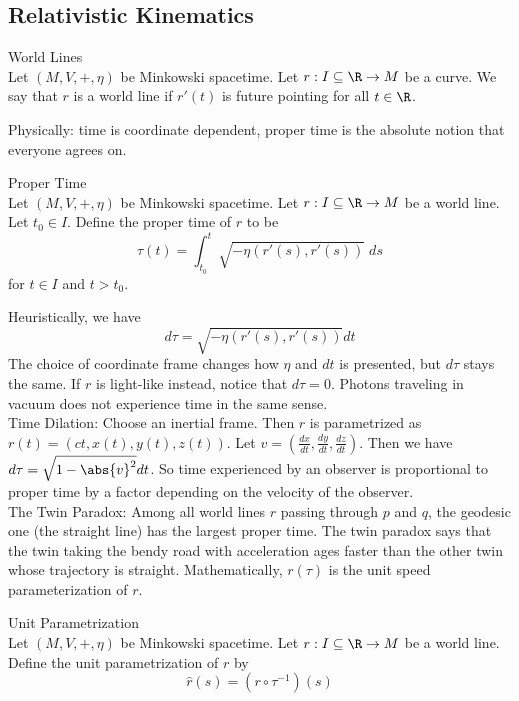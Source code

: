 \documentclass[a4paper]{article}
\begin{document}
\subsection{Relativistic Kinematics}
\begin{defn}{World Lines}{}\\
Let $(M,V,+,\eta)$ be Minkowski spacetime. Let $r:I\subseteq\R\to M$ be a curve. We say that $r$ is a world line if $r'(t)$ is future pointing for all $t\in\R$. 
\end{defn}

Physically: time is coordinate dependent, proper time is the absolute notion that everyone agrees on. 

\begin{defn}{Proper Time}{}\\
Let $(M,V,+,\eta)$ be Minkowski spacetime. Let $r:I\subseteq\R\to M$ be a world line. Let $t_0\in I$. Define the proper time of $r$ to be $$\tau(t)=\int_{t_0}^t\sqrt{-\eta(r'(s),r'(s))}\;ds$$ for $t\in I$ and $t>t_0$. 
\end{defn}

Heuristically, we have $$d\tau=\sqrt{-\eta(r'(s),r'(s))}dt$$ The choice of coordinate frame changes how $\eta$ and $dt$ is presented, but $d\tau$ stays the same. If $r$ is light-like instead, notice that $d\tau=0$. Photons traveling in vacuum does not experience time in the same sense. \\

Time Dilation: Choose an inertial frame. Then $r$ is parametrized as $r(t)=(ct,x(t),y(t),z(t))$. Let $v=\left(\frac{dx}{dt},\frac{dy}{dt},\frac{dz}{dt}\right)$. Then we have $d\tau=\sqrt{1-\abs{v}^2}dt$. So time experienced by an observer is proportional to proper time by a factor depending on the velocity of the observer. \\

The Twin Paradox: Among all world lines $r$ passing through $p$ and $q$, the geodesic one (the straight line) has the largest proper time. The twin paradox says that the twin taking the bendy road with acceleration ages faster than the other twin whose trajectory is straight. Mathematically, $r(\tau)$ is the unit speed parameterization of $r$. 

\begin{defn}{Unit Parametrization}{}\\
Let $(M,V,+,\eta)$ be Minkowski spacetime. Let $r:I\subseteq\R\to M$ be a world line. Define the unit parametrization of $r$ by $$\widehat{r}(s)=(r\circ\tau^{-1})(s)$$
\end{defn}
\end{document}
